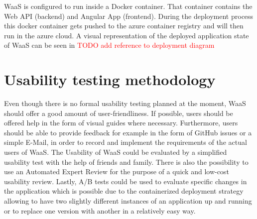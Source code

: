 \documentclass[titlepage, 12pt]{article}
\begin{document}
WaaS is configured to run inside a Docker container. That container contains the Web API (backend) and Angular App (frontend). During the deployment process this docker container gets pushed to the azure container registry and will then run in the azure cloud. A visual representation of the deployed application state of WaaS can be seen in \textcolor{red}{TODO add reference to deployment diagram}


\section {Usability testing methodology}
Even though there is no formal usability testing planned at the moment, WaaS should offer a good amount of user-friendliness.
If possible, users should be offered help in the form of visual guides where necessary.
Furthermore, users should be able to provide feedback for example in the form of GitHub issues or a simple E-Mail, in order to record and implement the requirements of the actual users of WaaS.
The Usability of WaaS could be evaluated by a simplified usability test with the help of friends and family.
There is also the possibility to use an Automated Expert Review for the purpose of a quick and low-cost usability review.
Lastly, A/B tests could be used to evaluate specific changes in the application which is possible due to the containerized deployment strategy allowing to have two slightly different
instances of an application up and running or to replace one version with another in a relatively easy way.

\pagebreak

\listoftables
\listoffigures

\pagebreak



\end{document}

